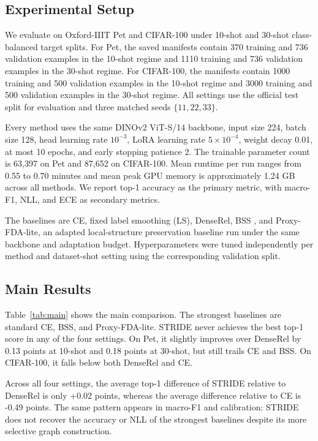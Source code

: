 \documentclass{article}
\newcommand{\method}{STRIDE\xspace}
\newcommand{\dense}{DenseRel\xspace}
\begin{document}
\subsection{Experimental Setup}

We evaluate on Oxford-IIIT Pet and CIFAR-100 under 10-shot and 30-shot class-balanced target splits. For Pet, the saved manifests contain 370 training and 736 validation examples in the 10-shot regime and 1110 training and 736 validation examples in the 30-shot regime. For CIFAR-100, the manifests contain 1000 training and 500 validation examples in the 10-shot regime and 3000 training and 500 validation examples in the 30-shot regime. All settings use the official test split for evaluation and three matched seeds $\{11,22,33\}$.

Every method uses the same DINOv2 ViT-S/14 backbone, input size 224, batch size 128, head learning rate $10^{-3}$, LoRA learning rate $5\times 10^{-4}$, weight decay 0.01, at most 10 epochs, and early stopping patience 2. The trainable parameter count is 63{,}397 on Pet and 87{,}652 on CIFAR-100. Mean runtime per run ranges from 0.55 to 0.70 minutes and mean peak GPU memory is approximately 1.24 GB across all methods. We report top-1 accuracy as the primary metric, with macro-F1, NLL, and ECE as secondary metrics.

The baselines are CE, fixed label smoothing (LS), \dense, BSS \citep{chen2019bss}, and Proxy-FDA-lite, an adapted local-structure preservation baseline run under the same backbone and adaptation budget. Hyperparameters were tuned independently per method and dataset-shot setting using the corresponding validation split.

\subsection{Main Results}

Table~\ref{tab:main} shows the main comparison. The strongest baselines are standard CE, BSS, and Proxy-FDA-lite. \method never achieves the best top-1 score in any of the four settings. On Pet, it slightly improves over \dense by 0.13 points at 10-shot and 0.18 points at 30-shot, but still trails CE and BSS. On CIFAR-100, it falls below both \dense and CE.

Across all four settings, the average top-1 difference of \method relative to \dense is only +0.02 points, whereas the average difference relative to CE is -0.49 points. The same pattern appears in macro-F1 and calibration: \method does not recover the accuracy or NLL of the strongest baselines despite its more selective graph construction.
\end{document}
